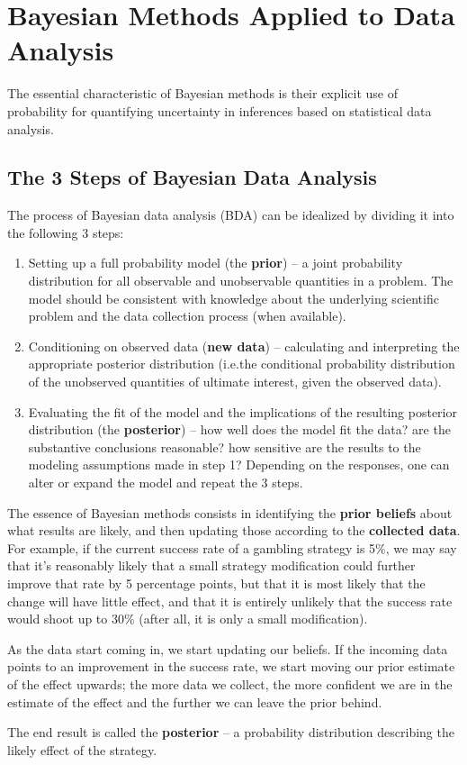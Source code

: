 \section{Bayesian Methods Applied to Data Analysis}%
The essential characteristic of Bayesian methods is their explicit use of probability for quantifying uncertainty in inferences based on statistical data analysis.
\subsection{The 3 Steps of Bayesian Data Analysis} 
 The process of Bayesian data analysis (BDA) can be idealized by dividing it into the following 3 steps:
\begin{enumerate}[noitemsep]
\item Setting up a full probability model (the \textbf{prior}) -- a joint probability distribution for all observable and
unobservable quantities in a problem. The model should be consistent with knowledge about the underlying scientific problem and the data collection process (when available).
\item Conditioning on observed data (\textbf{new data}) -- calculating and interpreting the appropriate posterior
distribution (i.e.\@ the conditional probability distribution of the unobserved quantities of ultimate interest, given the observed data).
\item Evaluating the fit of the model and the implications of the resulting posterior distribution (the \textbf{posterior}) -- how well does the model fit the data? are the substantive conclusions reasonable? how sensitive are the results to the modeling assumptions made in step 1? Depending on the responses, one can alter or expand the model and repeat the 3 steps.
\end{enumerate}
The essence of Bayesian methods consists in identifying the \textbf{prior beliefs} about what results are likely, and then updating those according to the \textbf{collected data}.
\newl For example, if the current success rate of a gambling strategy is 5\%, we may say that it's reasonably likely that a small strategy modification could further improve that rate by 5 percentage points, but that it is most likely that the change will have little effect, and that it is entirely unlikely that the success rate would shoot up to 30\% (after all, it is only a small modification). \par As the data start coming in, we start updating our beliefs. If the incoming data points to an improvement in the success rate, we start moving our prior estimate of the effect upwards; the more data we collect, the more confident we are in the estimate of the effect and the further we can leave the prior behind. \par The end result is called the \textbf{posterior} -- a probability distribution describing the likely effect of the strategy.
